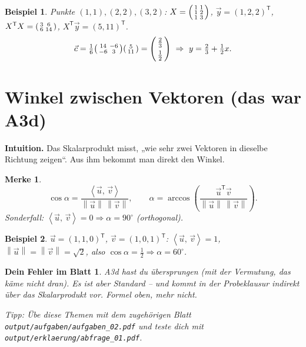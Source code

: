\documentclass[a4paper,11pt]{article}
\newenvironment{psmallmatrix}{\left(\begin{smallmatrix}}{\end{smallmatrix}\right)}
\newcommand{\transp}{^{\mathsf{T}}}
\newcommand{\norm}[1]{\left\lVert #1 \right\rVert}
\newcommand{\inner}[2]{\left\langle #1,\, #2 \right\rangle}
\theoremstyle{def0}
\newtheorem*{merke}{\textcolor{good}{Merke}}
\newtheorem*{fehler}{\textcolor{bad}{Dein Fehler im Blatt}}
\newtheorem*{bsp}{Beispiel}
\begin{document}
\begin{bsp}
Punkte $(1,1),(2,2),(3,2)$:
$X=\begin{psmallmatrix}1&1\\1&2\\1&3\end{psmallmatrix}$,
$\vec y=(1,2,2)\transp$,
$X\transp X=\begin{psmallmatrix}3&6\\6&14\end{psmallmatrix}$,
$X\transp\vec y=(5,11)\transp$.
\[
\vec c=\tfrac16\begin{psmallmatrix}14&-6\\-6&3\end{psmallmatrix}\begin{psmallmatrix}5\\11\end{psmallmatrix}
=\begin{psmallmatrix}\tfrac23\\[2pt]\tfrac12\end{psmallmatrix}
\ \Rightarrow\ y=\tfrac23+\tfrac12 x.
\]
\end{bsp}

\section{Winkel zwischen Vektoren (das war A3d)}

\textbf{Intuition.} Das Skalarprodukt misst, „wie sehr zwei Vektoren in dieselbe Richtung
zeigen“. Aus ihm bekommt man direkt den Winkel.

\begin{merke}
\[
  \cos\alpha = \frac{\inner{\vec u}{\vec v}}{\norm{\vec u}\,\norm{\vec v}},\qquad
  \alpha = \arccos\!\left(\frac{\vec u\transp\vec v}{\norm{\vec u}\,\norm{\vec v}}\right).
\]
Sonderfall: $\inner{\vec u}{\vec v}=0 \Rightarrow \alpha = 90^\circ$ (orthogonal).
\end{merke}

\begin{bsp}
$\vec u=(1,1,0)\transp$, $\vec v=(1,0,1)\transp$:\;
$\inner{\vec u}{\vec v}=1$, $\norm{\vec u}=\norm{\vec v}=\sqrt2$, also
$\cos\alpha=\tfrac{1}{2}\Rightarrow\alpha=60^\circ$.
\end{bsp}

\begin{fehler}
A3d hast du übersprungen (mit der Vermutung, das käme nicht dran). Es ist aber
Standard -- und kommt in der Probeklausur indirekt über das Skalarprodukt vor. Formel
oben, mehr nicht.
\end{fehler}

\vspace{0.6em}{\color{rulecol}\hrule}\vspace{0.4em}
\textit{Tipp: Übe diese Themen mit dem zugehörigen Blatt
\texttt{output/aufgaben/aufgaben\_02.pdf} und teste dich mit
\texttt{output/erklaerung/abfrage\_01.pdf}.}
\end{document}
